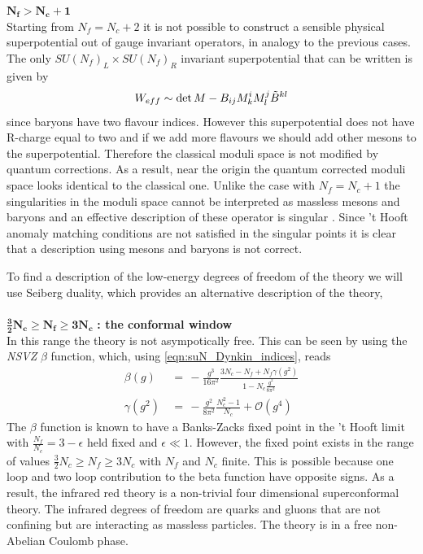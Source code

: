 $\mathbf{ N_f > N_c +1 }$\\
Starting from $N_f = N_c +2$ it is not possible to construct a sensible physical superpotential out of gauge invariant operators, in analogy to the previous cases.
The only $SU(N_f)_L \times SU(N_f)_R$ invariant superpotential that can be written is given by
\begin{equation}
 W_{eff} \sim \mathrm{det } \,{M} - B_{ij} M^i_k M^j_l \tilde{B}^{kl} 
 \end{equation} 
since baryons have two flavour indices.
However this superpotential does not have R-charge equal to two and if we add more flavours we should add other mesons to the superpotential. Therefore the classical moduli space is not modified by quantum corrections.
As a result, near the origin the quantum corrected moduli space looks identical to the classical one.
Unlike the case with $N_f = N_c +1$ the singularities in the moduli space cannot be interpreted as massless mesons and baryons and an effective description of these operator is singular \cite{Seiberg:1994bz}.
Since 't Hooft anomaly matching conditions are not satisfied in the singular points it is clear that a description using mesons and baryons is not correct.

To find a description of the low-energy degrees of freedom of the theory we will use Seiberg duality, which provides an alternative description of the theory,
\\
\\
$\mathbf{  \frac{3}{2} N_c \geq N_f \geq  3 N_c}$ \textbf{: the conformal window}\\
In this range the theory is not asympotically free. This can be seen by using the \emph{NSVZ} $\beta$ function, which, using \eqref{eqn:suN_Dynkin_indices}, reads
\begin{align}
 \beta (g) & \, = \,- \frac{g^3}{16 \pi^2} \frac{3 N_c - N_f + N_f \gamma(g^2)}{1 - N_c \frac{g^2}{8 \pi^2}} \\
\gamma(g^2) &  \,= \, - \frac{g^2}{8 \pi^2} \frac{N_c^2 - 1}{N_c} + \mathcal{O} (g^4)
\end{align} 
The $\beta$ function is known to have a Banks-Zacks fixed point \cite{Banks:1981nn} in the 't Hooft limit with $\frac{N_f}{N_c} = 3 - \epsilon$ held fixed and $\epsilon \ll 1$.
However, the fixed point exists in the range of values $\frac{3}{2} N_c \geq N_f \geq  3 N_c$ with $N_f$ and $N_c$ finite.
This is possible because one loop and two loop contribution to the beta function have opposite signs.
As a result, the infrared red theory is a non-trivial four dimensional superconformal theory. 
The infrared degrees of freedom are quarks and gluons that are not confining but are interacting as massless particles.
The theory is in a free non-Abelian Coulomb phase.

